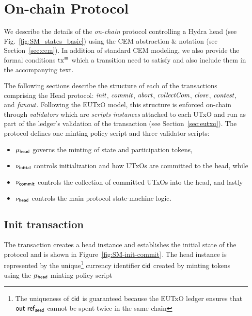 \section{On-chain Protocol}\label{sec:on-chain}


We describe the details of the \emph{on-chain} protocol controlling a
Hydra head (see Fig.~\ref{fig:SM_states_basic}) using the CEM abstraction \&
notation (see Section~\ref{sec:cem}). In addition of standard CEM modeling, we
also provide the formal conditions $\mathrm{tx}^\equiv$ which a transition need to
satisfy and also include them in the accompanying text.

The following sections describe the structure of each of the transactions
comprising the Head protocol: $\textit{init}{}$, $\textit{commit}{}$, $\textit{abort}{}$,
$\textit{collectCom}{}$, $\textit{close}{}$, $\textit{contest}{}$, and $\textit{fanout}{}$. Following
the EUTxO model, this structure is enforced on-chain through \emph{validators}
which are \emph{scripts instances} attached to each UTxO and run as part of the
ledger's validation of the transaction (see Section~\ref{sec:eutxo}). The
protocol defines one minting policy script and three validator scripts:
\begin{itemize}
  \item $\mu_\mathsf{head}$ governs the minting of state and participation tokens,
  \item $\nu_{\mathsf{initial}}$ controls initialization and how UTxOs are committed to the head, while
  \item $\nu_{\mathsf{commit}}$ controls the collection of committed UTxOs into the head, and lastly
  \item $\nu_\mathsf{head}$ controls the main protocol state-machine logic.
\end{itemize}

\subsection{Init transaction}\label{sec:init-tx}

The \mtxInit{} transaction creates a head instance and establishes the initial
state of the protocol and is shown in Figure~\ref{fig:SM-init-commit}. The head
instance is represented by the unique\footnote{The uniqueness of $\mathsf{cid}$ is
  guaranteed because the EUTxO ledger ensures that $\mathsf{out\textsf{-}{}ref}_{\mathsf{seed}}$
  cannot be spent twice in the same chain} currency identifier $\mathsf{cid}$ created by
minting tokens using the $\mu_\mathsf{head}$ minting policy script

